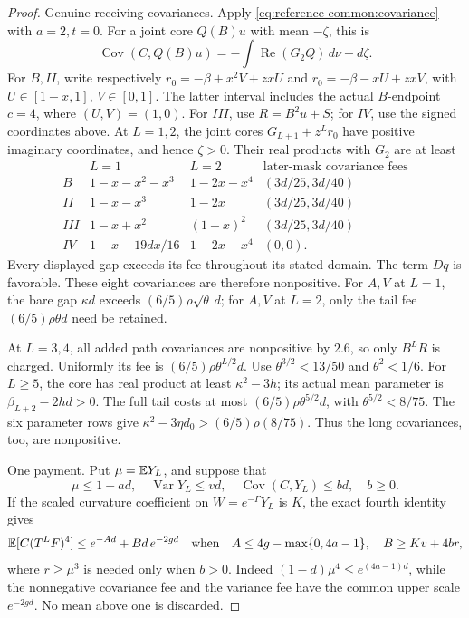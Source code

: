 \begin{proof}
Genuine receiving covariances. Apply
\eqref{eq:reference-common:covariance} with \(a=2,t=0\).
For a joint core \(Q(B)u\) with mean \(-\zeta\), this is
\[
 \operatorname{Cov}(C,Q(B)u)
 =-\int\operatorname{Re}(G_2Q)\,d\nu-d\zeta.
\]
For \(B,II\), write respectively
\(r_0=-\beta+x^2V+zxU\) and
\(r_0=-\beta-xU+zxV\), with \(U\in[1-x,1]\), \(V\in[0,1]\).
The latter interval includes the actual \(B\)-endpoint \(c=4\), where \((U,V)=(1,0)\).
For \(III\), use \(R=B^2u+S\); for \(IV\), use the signed
coordinates above. At \(L=1,2\), the joint cores
\(G_{L+1}+z^Lr_0\) have positive imaginary coordinates, and hence
\(\zeta>0\). Their real products with \(G_2\) are at least
\[
\begin{array}{c|c|c|c}
 &L=1&L=2&\text{later-mask covariance fees}\\\hline
B&1-x-x^2-x^3&1-2x-x^4&(3d/25,3d/40)\\
II&1-x-x^3&1-2x&(3d/25,3d/40)\\
III&1-x+x^2&(1-x)^2&(3d/25,3d/40)\\
IV&1-x-19dx/16&1-2x-x^4&(0,0).
\end{array}
\]
Every displayed gap exceeds its fee throughout its stated domain.
The term \(Dq\) is favorable. These eight covariances are therefore
nonpositive. For \(A,V\) at \(L=1\), the bare gap \(\kappa d\)
exceeds \((6/5)\rho\sqrt\theta\,d\); for \(A,V\) at \(L=2\),
only the tail fee \((6/5)\rho\theta d\) need be retained.

At \(L=3,4\), all added path covariances are nonpositive by
\(2.6\), so only \(B^LR\) is charged. Uniformly its fee is
\((6/5)\rho\theta^{L/2}d\). Use
\(\theta^{3/2}<13/50\) and \(\theta^2<1/6\).
For \(L\ge5\), the core has real product at least
\(\kappa^2-3h\); its actual mean parameter is
\(\beta_{L+2}-2hd>0\). The full tail costs at most
\((6/5)\rho\theta^{5/2}d\), with \(\theta^{5/2}<8/75\).
The six parameter rows give
\(\kappa^2-3\eta d_0>(6/5)\rho(8/75)\).
Thus the long covariances, too, are nonpositive.

One payment. Put \(\mu=\mathbb E Y_L\), and suppose that
\[
 \mu\le1+ad,\quad \operatorname{Var}Y_L\le vd,\quad
 \operatorname{Cov}(C,Y_L)\le bd,\quad b\ge0.
\]
If the scaled curvature coefficient on \(W=e^{-\Gamma}Y_L\)
is \(K\), the exact fourth identity gives
\begin{equation}\label{eq:R34:unit-payment}
 \mathbb E[C(T^LF)^4]\le e^{-Ad}+Bd\,e^{-2gd}
 \quad\text{when}\quad
 A\le4g-\max\{0,4a-1\},\quad B\ge Kv+4br,
\end{equation}
where \(r\ge\mu^3\) is needed only when \(b>0\).
Indeed \((1-d)\mu^4\le e^{(4a-1)d}\), while the nonnegative
covariance fee and the variance fee have the common upper scale
\(e^{-2gd}\). No mean above one is discarded.


\end{proof}
